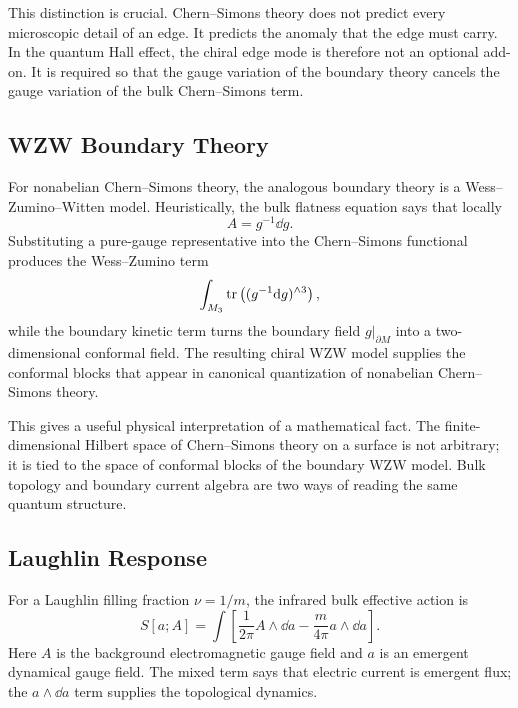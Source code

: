This distinction is crucial. Chern--Simons theory does not predict every microscopic detail of an edge. It predicts the anomaly that the edge must carry. In the quantum Hall effect, the chiral edge mode is therefore not an optional add-on. It is required so that the gauge variation of the boundary theory cancels the gauge variation of the bulk Chern--Simons term.

\subsection{WZW Boundary Theory}
\label{subsec:nonabelian-wzw-boundary}

For nonabelian Chern--Simons theory, the analogous boundary theory is a Wess--Zumino--Witten model. Heuristically, the bulk flatness equation says that locally
\begin{equation}
  A=g^{-1}\dd g.
  \label{eq:anomaly-flat-pure-gauge}
\end{equation}
Substituting a pure-gauge representative into the Chern--Simons functional produces the Wess--Zumino term
\begin{equation}
  \int_{M_3}\operatorname{tr}\left((g^{-1}\mathrm{d} g)^{\wedge 3}\right),
  \label{eq:anomaly-wz-term}
\end{equation}
while the boundary kinetic term turns the boundary field $g|_{\partial M}$ into a two-dimensional conformal field. The resulting chiral WZW model supplies the conformal blocks that appear in canonical quantization of nonabelian Chern--Simons theory.

This gives a useful physical interpretation of a mathematical fact. The finite-dimensional Hilbert space of Chern--Simons theory on a surface is not arbitrary; it is tied to the space of conformal blocks of the boundary WZW model. Bulk topology and boundary current algebra are two ways of reading the same quantum structure.

\subsection{Laughlin Response}
\label{subsec:laughlin-response}

For a Laughlin filling fraction $\nu=1/m$, the infrared bulk effective action is
\begin{equation}
  S[a;A]
  =
  \int\left[
  \frac{1}{2\pi}A\wedge\dd a
  -
  \frac{m}{4\pi}a\wedge\dd a
  \right].
  \label{eq:anomaly-laughlin-action}
\end{equation}
Here $A$ is the background electromagnetic gauge field and $a$ is an emergent dynamical gauge field. The mixed term says that electric current is emergent flux; the $a\wedge\dd a$ term supplies the topological dynamics.

